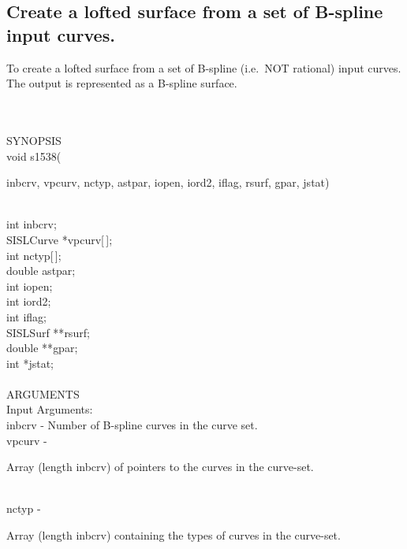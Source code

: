 \subsection{Create a lofted surface from a set of B-spline
input curves.}
\begin{minipg1}
  To create a lofted surface from a set of B-spline (i.e.\ NOT rational)
  input curves.
  The output is represented as a B-spline surface.
\end{minipg1} \\ \\
SYNOPSIS\\
        \>void s1538(\begin{minipg3}
          {\fov inbcrv}, {\fov vpcurv}, {\fov nctyp}, {\fov astpar}, {\fov iopen}, {\fov iord2},
          {\fov iflag}, {\fov rsurf}, {\fov gpar}, {\fov jstat})
        \end{minipg3}\\[0.3ex]
        \>\>    int       \> {\fov inbcrv};\\
        \>\>    SISLCurve \> *{\fov vpcurv}[\,];\\
        \>\>    int       \> {\fov nctyp}[\,];\\
        \>\>    double    \> {\fov astpar};\\
        \>\>    int       \> {\fov iopen};\\
        \>\>    int       \> {\fov iord2};\\
        \>\>    int       \> {\fov iflag};\\
        \>\>    SISLSurf  \> **{\fov rsurf};\\
        \>\>    double    \> **{\fov gpar};\\
        \>\>    int       \> *{\fov jstat};\\
\\
ARGUMENTS\\
        \>Input Arguments:\\
        \>\>    {\fov inbcrv} \> - \> Number of B-spline curves in the curve set.\\
        \>\>    {\fov vpcurv} \> - \>
        \begin{minipg2}
          Array (length {\fov inbcrv}) of pointers to the
          curves in the curve-set.
        \end{minipg2}\\[0.8ex]
        \>\>    {\fov nctyp}  \> - \>
        \begin{minipg2}
          Array (length {\fov inbcrv}) containing the types
          of curves in the curve-set.
        \end{minipg2}\\[0.8ex]
